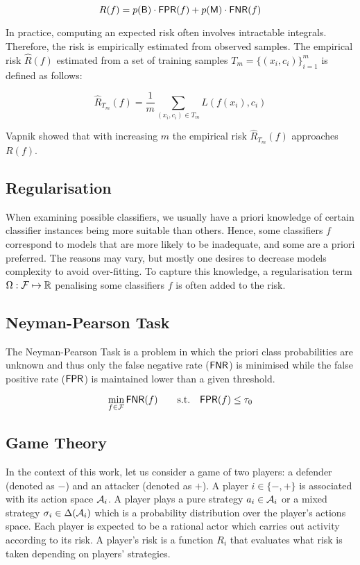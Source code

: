 \begin{equation}
R(f) = p(\mathsf{B}) \cdot \textsf{FPR}(f) + p(\mathsf{M}) \cdot \textsf{FNR}(f)
\end{equation}

In practice, computing an expected risk often involves intractable integrals. Therefore, the
risk is empirically estimated from observed samples. The empirical risk
$\hat{R}(f)$ estimated from a set of training samples
$T_m = \{ (x_i, c_i) \}_{i=1}^{m}$ is defined as follows:

\begin{equation}
\hat{R}_{T_m}(f) = \frac{1}{m} \sum_{(x_i, c_i) \in T_m} L(f(x_i), c_i)
\end{equation}

Vapnik \cite{vapnik} showed that with increasing $m$ the empirical risk
$\hat{R}_{T_m}(f)$ approaches $R(f)$.

\subsection{Regularisation}

When examining possible classifiers, we usually have a priori knowledge
of certain classifier instances being more suitable than others. Hence,
some classifiers $f$ correspond to models that are more likely to be
inadequate, and some are a priori preferred. The reasons may vary, but
mostly one desires to decrease models complexity to avoid over-fitting.
To capture this knowledge, a regularisation term
$\Omega: \mathcal{F} \mapsto \mathbb{R}$ penalising some classifiers
$f$ is often added to the risk.

\subsection{Neyman-Pearson Task}\label{sec:neyman-pearson}
The Neyman-Pearson Task \cite{neyman-pearson} is a problem in which the priori class probabilities are unknown and thus only the false negative rate ($\textsf{FNR}$) is minimised while the false positive rate ($\textsf{FPR}$) is maintained lower than a given threshold.

\begin{equation}\label{eq:neyman-pearson}
    \min_{f \in \mathcal{F}}
        \textsf{FNR}(f)
        \qquad \text{s.t.} \quad
        \textsf{FPR}(f) \leq \tau_0
\end{equation}

\subsection{Game Theory}
In the context of this work, let us consider a game of two players: a defender (denoted as $\minus$) and an attacker (denoted as $\plus$). A player $i \in \{ \minus, \plus\}$ is associated with its action space $\mathcal{A}_i$. A player plays a pure strategy $a_i \in \mathcal{A}_i$ or a mixed strategy $\sigma_i \in \Delta(\mathcal{A}_i)$ which is a probability distribution over the player's actions space. Each player is expected to be a rational actor which carries out activity according to its risk. A player's risk is a function $R_i$ that evaluates what risk is taken depending on players' strategies.

